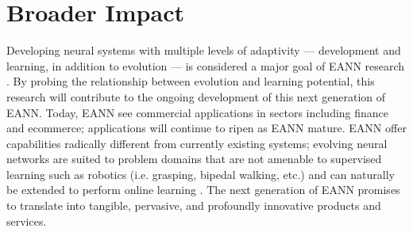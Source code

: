 \section{Broader Impact}

Developing neural systems with multiple levels of adaptivity --- development and learning, in addition to evolution --- is considered a major goal of EANN research \autocite{Downing2015IntelligenceSystems}.
By probing the relationship between evolution and learning potential, this research will contribute to the ongoing development of this next generation of EANN.
Today, EANN see commercial applications in sectors including finance and ecommerce; applications will continue to ripen as EANN mature.
EANN offer capabilities radically different from currently existing systems; evolving neural networks are suited to problem domains that are not amenable to supervised learning such as robotics (i.e. grasping, bipedal walking, etc.) \autocite{Downing2015IntelligenceSystems} and can naturally be extended to perform online learning \autocite{Tonelli2013OnNetworks}.
The next generation of EANN promises to translate into tangible, pervasive, and profoundly innovative products and services.



